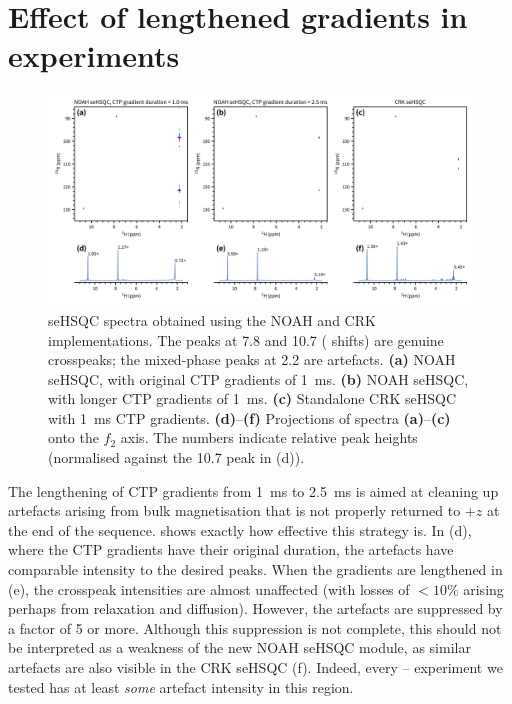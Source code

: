 \section{Effect of lengthened gradients in \texorpdfstring{\nitrogen{}}{15N} experiments}

\begin{figure}
    \centering
    \includegraphics[width=\textwidth]{./figures/cnst16_diff.png}
    \caption{
        \nitrogen{} seHSQC spectra obtained using the NOAH and CRK implementations.
        The peaks at 7.8 and \SI{10.7}{\ppm} (\proton{} shifts) are genuine crosspeaks; the mixed-phase peaks at \SI{2.2}{\ppm} are artefacts.
        \textbf{(a)} NOAH seHSQC, with original CTP gradients of \SI{1}{\ms}.
        \textbf{(b)} NOAH seHSQC, with longer CTP gradients of \SI{1}{\ms}.
        \textbf{(c)} Standalone CRK seHSQC with \SI{1}{\ms} CTP gradients.
        \textbf{(d)}--\textbf{(f)} Projections of spectra \textbf{(a)}--\textbf{(c)} onto the $f_2$ axis.
        The numbers indicate relative peak heights (normalised against the \SI{10.7}{\ppm} peak in (d)).
        \zolmi{}
    }
    \label{fig:cnst16_diff}
\end{figure}

The lengthening of CTP gradients from \SI{1}{\ms} to \SI{2.5}{\ms} is aimed at cleaning up artefacts arising from bulk magnetisation that is not properly returned to $+z$ at the end of the sequence.
 shows exactly how effective this strategy is.
In (d), where the CTP gradients have their original duration, the artefacts have comparable intensity to the desired peaks.
When the gradients are lengthened in (e), the crosspeak intensities are almost unaffected (with losses of $<10\%$ arising perhaps from relaxation and diffusion).
However, the artefacts are suppressed by a factor of 5 or more.
Although this suppression is not complete, this should not be interpreted as a weakness of the new NOAH seHSQC module, as similar artefacts are also visible in the CRK seHSQC (f).
Indeed, every \nitrogen{}--\proton{} experiment we tested has at least \textit{some} artefact intensity in this region.

